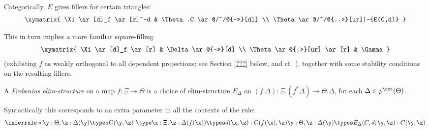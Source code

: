 Categorically, $E$ gives fillers for certain triangles:
$$\xymatrix{ \Xi \ar[d]_f \ar[r]^-d & \Theta.C \ar@/^/@{->>}[dl] \\
\Theta \ar@/^/@{..>}[ur]|-{E(C,d)} } $$  %

This in turn implies a more familiar square-filling
$$\xymatrix{ \Xi \ar[d]_f \ar[r] & \Delta \ar@{->>}[d] \\
\Theta \ar@{.>}[ur] \ar[r] & \Gamma }$$
(exhibiting $f$ as weakly orthogonal to all dependent projections; see Section \ref{???} below, and cf.\ \cite{gambino-garner}), together with some stability conditions on the resulting fillers. 

\begin{definition}A \emph{Frobenius elim-structure} on a map $f \colon \Xi \to \Theta$ is a choice of elim-structure $E_\Delta$ on $(f.\Delta) \colon \Xi.(f^*\Delta) \to \Theta.\Delta$, for each $\Delta \in p^\cxt(\Theta)$.
\end{definition}

Syntactically this corresponds to an extra parameter in all the contexts of the rule:
$$\inferrule*{ \y : \Theta, \z : \Delta(\y) \types C(\y,\z)\ \type \\
\x : \Xi, \z: \Delta(f(\x)) \types d(\x,\z) : C(f(\x),\z) }
{\y : \Theta, \z : \Delta(\y) \types E_\Delta(C,d;\y,\z) : C(\y,\z)}$$


